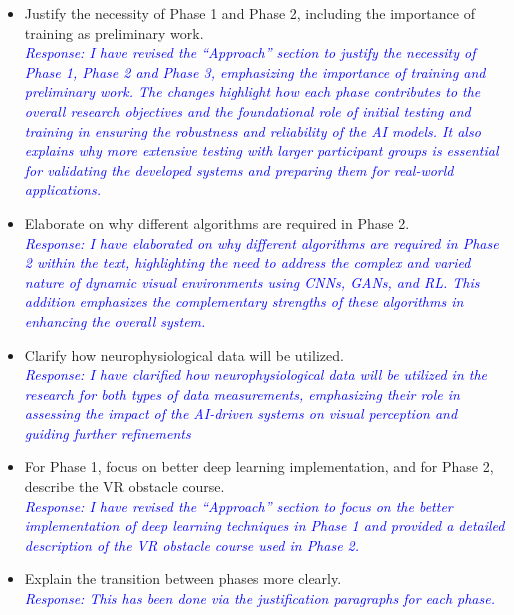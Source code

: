 \documentclass[10pt]{article}
\begin{document}
\begin{itemize}
  \item Justify the necessity of Phase 1 and Phase 2, including the importance of training as preliminary work.\\
        \textcolor{blue}{\textit{Response: I have revised the ``Approach''
            section to justify the necessity of Phase 1, Phase 2 and Phase 3,
            emphasizing the importance of training and preliminary work. The changes
            highlight how each phase contributes to the overall research objectives
            and the foundational role of initial testing and training in ensuring
            the robustness and reliability of the AI models. It also explains why
            more extensive testing with larger participant groups is essential for validating the developed systems and preparing them for real-world applications.}}

  \item Elaborate on why different algorithms are required in Phase 2.\\
        \textcolor{blue}{\textit{Response:  I have elaborated on why different algorithms are required in Phase 2 within the text, highlighting the need to address the complex and varied nature of dynamic visual environments using CNNs, GANs, and RL\@. This addition emphasizes the complementary strengths of these algorithms in enhancing the overall system.}}

  \item Clarify how neurophysiological data will be utilized.\\
        \textcolor{blue}{\textit{Response: I have clarified how
            neurophysiological data will be utilized in the research for both types
            of data measurements, emphasizing
            their role in assessing the impact of the AI-driven systems on visual
            perception and guiding further refinements}}

  \item For Phase 1, focus on better deep learning implementation, and for Phase 2, describe the VR obstacle course.\\
        \textcolor{blue}{\textit{Response: I have revised the ``Approach'' section to focus on the better implementation of deep learning techniques in Phase 1 and provided a detailed description of the VR obstacle course used in Phase 2.}}

  \item Explain the transition between phases more clearly.\\
        \textcolor{blue}{\textit{Response: This has been done via the
            justification paragraphs for each phase.}}


\end{itemize}
\end{document}
